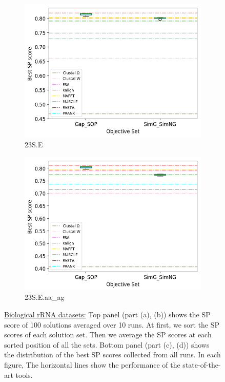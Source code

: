 \begin{figure}[!htbp]
\begin{adjustwidth}{-0.2cm}{}
		\begin{subfigure}{0.5\columnwidth}
			\includegraphics[width=\columnwidth]{Figure/summary/precomputedInit/23S.E/objset_pairs_rank}
			\caption{23S.E}
		\end{subfigure}	
		\begin{subfigure}{0.5\columnwidth}
			\includegraphics[width=\columnwidth]{Figure/summary/precomputedInit/23S.E.aa_ag/objset_pairs_rank}
			\caption{23S.E.aa\_ag}
		\end{subfigure}
	\end{adjustwidth}
	\caption{\underline{Biological rRNA datasets:} Top panel (part (a), (b)) shows the SP score of 100 solutions averaged over 10 runs. At first, we sort the SP scores of each solution set. Then we average the SP scores at each sorted position of all the sets. Bottom panel (part (c), (d)) shows the distribution of the best SP scores collected from all runs. In each figure, The horizontal lines show the performance of the state-of-the-art tools.}
	\label{fig:sp_bio}
\end{figure}

